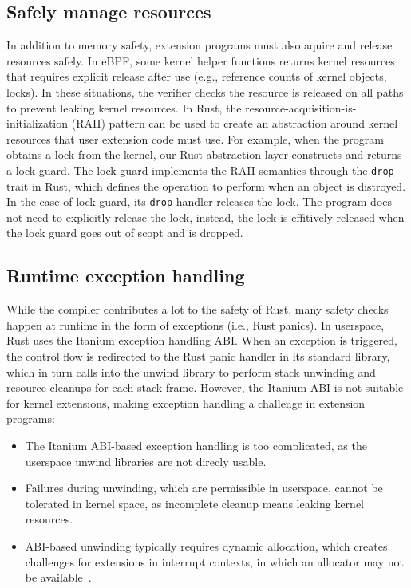 \subsection{Safely manage resources}
In addition to memory safety, extension programs must also aquire and release
    resources safely.
In eBPF, some kernel helper functions returns kernel resources that requires
    explicit release after use (e.g., reference counts of kernel objects,
    locks).
In these situations, the verifier checks the resource is released on all paths
    to prevent leaking kernel resources.
In Rust, the resource-acquisition-is-initialization (RAII) pattern can be used
    to create an abstraction around kernel resources that user extension code
    must use.
For example, when the program obtains a lock from the kernel, our Rust
    abstraction layer constructs and returns a lock guard.
The lock guard implements the RAII semantics through the \texttt{drop} trait in
    Rust, which defines the operation to perform when an object is distroyed.
In the case of lock guard, its \texttt{drop} handler releases the lock.
The program does not need to explicitly release the lock, instead, the lock is
    effitively released when the lock guard goes out of scopt and is dropped.

\subsection{Runtime exception handling}
While the compiler contributes a lot to the safety of Rust, many safety checks
    happen at runtime in the form of exceptions (i.e., Rust panics).
In userspace, Rust uses the Itanium exception handling ABI.
When an exception is triggered, the control flow is redirected to the Rust
    panic handler in its standard library, which in turn calls into the unwind
    library to perform stack unwinding and resource cleanups for each stack
    frame.
However, the Itanium ABI is not suitable for kernel extensions, making
    exception handling a challenge in extension programs:
\begin{itemize}
    \item The Itanium ABI-based exception handling is too complicated, as the
        userspace unwind libraries are not direcly usable.
    \item Failures during unwinding, which are permissible in userspace, cannot
        be tolerated in kernel space, as incomplete cleanup means leaking
        kernel resources.
    \item ABI-based unwinding typically requires dynamic allocation, which
        creates challenges for extensions in interrupt contexts, in which an
        allocator may not be available~\cite{bpf-mempool-lwn}.
\end{itemize}


